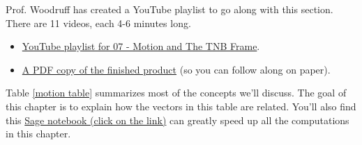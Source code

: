 
Prof. Woodruff has created a YouTube playlist to go along with this section. There are 11 videos, each 4-6 minutes long.
\begin{itemize}
 \item \href{http://www.youtube.com/playlist?list=PL30EE81142B1ED1F0&feature=plcp}{YouTube playlist for 07 - Motion and The TNB Frame}.
 \item \href{http://db.tt/FmEGk9p5}{A PDF copy of the finished product} (so you can follow along on paper).
\end{itemize}
Table \ref{motion table} summarizes most of the concepts we'll discuss. The goal of this chapter is to explain how the vectors in this table are related.  You'll also find this \href{\sageurlforcurvature}{Sage notebook (click on the link)} can greatly speed up all the computations in this chapter. 

